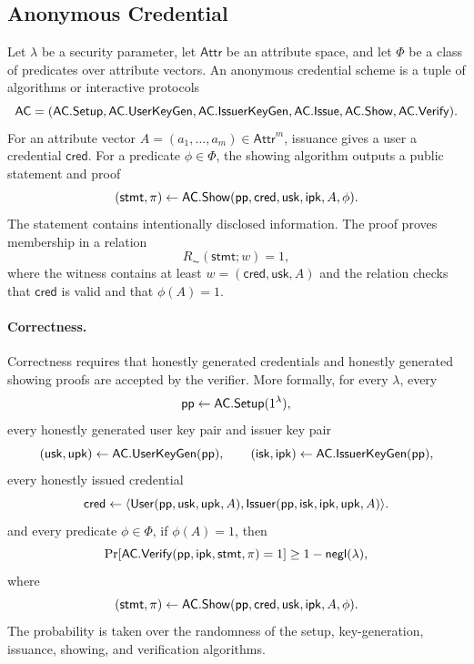 \subsection{Anonymous Credential}
\begin{definition}
Let $\lambda$ be a security parameter, let $\mathsf{Attr}$ be an attribute space, and let $\Phi$ be a class of predicates over attribute vectors. An anonymous credential scheme is a tuple of algorithms or interactive protocols
\begin{equation*}
  \mathsf{AC}=(\mathsf{AC}.\mathsf{Setup},\mathsf{AC}.\mathsf{UserKeyGen},\mathsf{AC}.\mathsf{IssuerKeyGen},\mathsf{AC}.\mathsf{Issue},\mathsf{AC}.\mathsf{Show},\mathsf{AC}.\mathsf{Verify}).
\end{equation*}
For an attribute vector $A=(a_1,\ldots,a_m)\in\mathsf{Attr}^m$, issuance gives a user a credential $\mathsf{cred}$. For a predicate $\phi\in\Phi$, the showing algorithm outputs a public statement and proof
\begin{equation*}
  (\mathsf{stmt},\pi)\leftarrow\mathsf{AC}.\mathsf{Show}(\mathsf{pp},\mathsf{cred},\mathsf{usk},\mathsf{ipk},A,\phi).
\end{equation*}
The statement contains intentionally disclosed information. The proof proves membership in a relation
\begin{equation*}
  R_{\AC}(\mathsf{stmt};w)=1,
\end{equation*}
where the witness contains at least $w=(\mathsf{cred},\mathsf{usk},A)$ and the relation checks that $\mathsf{cred}$ is valid and that $\phi(A)=1$.
\end{definition}

\paragraph{Correctness.}
Correctness requires that honestly generated credentials and honestly generated showing proofs are accepted by the verifier. More formally, for every \(\lambda\), every
\begin{equation*}
  \mathsf{pp} \leftarrow \mathsf{AC}.\mathsf{Setup}(1^\lambda),
\end{equation*}
every honestly generated user key pair and issuer key pair
\begin{equation*}
  (\mathsf{usk},\mathsf{upk}) \leftarrow \mathsf{AC}.\mathsf{UserKeyGen}(\mathsf{pp}),
  \qquad
  (\mathsf{isk},\mathsf{ipk}) \leftarrow \mathsf{AC}.\mathsf{IssuerKeyGen}(\mathsf{pp}),
\end{equation*}
every honestly issued credential
\begin{equation*}
  \mathsf{cred}
  \leftarrow
  \langle
  \mathsf{User}(\mathsf{pp},\mathsf{usk},\mathsf{upk},A),
  \mathsf{Issuer}(\mathsf{pp},\mathsf{isk},\mathsf{ipk},\mathsf{upk},A)
  \rangle.
\end{equation*}
and every predicate \(\phi\in\Phi\), if \(\phi(A)=1\), then
\begin{equation*}
  \Pr[
    \mathsf{AC}.\mathsf{Verify}(\mathsf{pp},\mathsf{ipk},\mathsf{stmt},\pi)=1
  ]
  \geq 1-\mathsf{negl}(\lambda),
\end{equation*}
where
\begin{equation*}
  (\mathsf{stmt},\pi)
  \leftarrow
  \mathsf{AC}.\mathsf{Show}(\mathsf{pp},\mathsf{cred},\mathsf{usk},\mathsf{ipk},A,\phi).
\end{equation*}
The probability is taken over the randomness of the setup, key-generation, issuance, showing, and verification algorithms.

